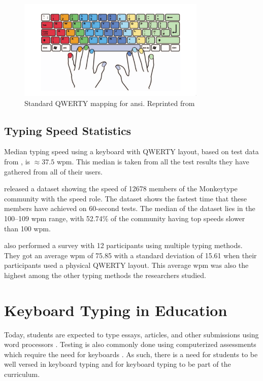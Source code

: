 \documentclass{report}
\begin{document}
\begin{figure}[H]
	\centering
	\includegraphics[width=0.8\textwidth]{touch-type.png}
	\caption{Standard QWERTY mapping for \ac{ansi}. Reprinted from }
	\label{fig:touch-type}
	\centering
\end{figure}

\subsection{Typing Speed Statistics}

Median typing speed using a keyboard with QWERTY layout, based on test data from
\textcite{keybr}, is $\approx37.5$ \ac{wpm}. This median is taken from all the test
results they have gathered from all of their users.

\textcite{monkey-stats} released a dataset showing the speed of 12678 members of the
Monkeytype community with the speed role. The dataset shows the fastest time
that these members have achieved on 60-second tests. The median of the dataset
lies in the 100--109 \ac{wpm} range, with 52.74\% of the community having top
speeds slower than 100 \ac{wpm}.

\textcite{arif2009} also performed a survey with 12 participants using
multiple typing methods. They got an average \ac{wpm} of 75.85 with a standard
deviation of 15.61 when their participants used a physical QWERTY layout. This
average \ac{wpm} was also the highest among the other typing methods the
researchers studied.

\section{Keyboard Typing in Education}

Today, students are expected to type essays, articles, and other submissions
using word processors \parencite{poole2016}. Testing is also commonly done using
computerized assessments which require the need for keyboards
\parencite{moodle}. As such, there is a need for students to be well versed in
keyboard typing and for keyboard typing to be part of the curriculum.
\end{document}
